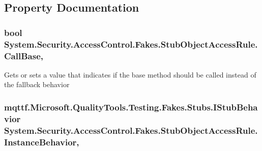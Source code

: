 \subsection{Property Documentation}
\hypertarget{class_system_1_1_security_1_1_access_control_1_1_fakes_1_1_stub_object_access_rule_a712998609b0ce244173eedfc3074b44a}{
\subsubsection[{Call\-Base}]{\setlength{\rightskip}{0pt plus 5cm}bool System.\-Security.\-Access\-Control.\-Fakes.\-Stub\-Object\-Access\-Rule.\-Call\-Base\hspace{0.3cm}{\ttfamily [get]}, {\ttfamily [set]}}}\label{class_system_1_1_security_1_1_access_control_1_1_fakes_1_1_stub_object_access_rule_a712998609b0ce244173eedfc3074b44a}


Gets or sets a value that indicates if the base method should be called instead of the fallback behavior

\hypertarget{class_system_1_1_security_1_1_access_control_1_1_fakes_1_1_stub_object_access_rule_a24f75b6b50925bd834c2f107b38d2a2d}{
\subsubsection[{Instance\-Behavior}]{\setlength{\rightskip}{0pt plus 5cm}mqttf.\-Microsoft.\-Quality\-Tools.\-Testing.\-Fakes.\-Stubs.\-I\-Stub\-Behavior System.\-Security.\-Access\-Control.\-Fakes.\-Stub\-Object\-Access\-Rule.\-Instance\-Behavior\hspace{0.3cm}{\ttfamily [get]}, {\ttfamily [set]}}}\label{class_system_1_1_security_1_1_access_control_1_1_fakes_1_1_stub_object_access_rule_a24f75b6b50925bd834c2f107b38d2a2d}


